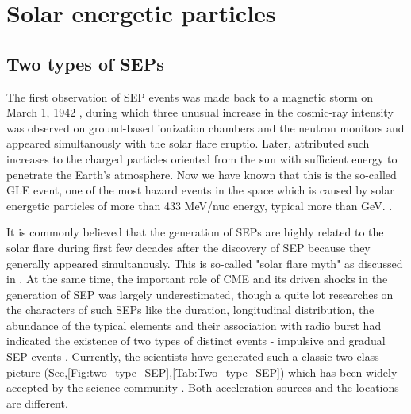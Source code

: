 \section{Solar energetic particles}

\subsection{Two types of SEPs}


The first observation of \ac{SEP} events was made back to a magnetic storm on March 1, 1942 \citet{lange1942note,forbush1942further}, during which three unusual increase in the cosmic-ray intensity was observed on ground-based ionization chambers and the neutron monitors and appeared simultanously with the solar flare eruptio. Later, \citep{Forbush1946} attributed such increases to the charged particles oriented from the sun with sufficient energy to penetrate the Earth's atmosphere. Now we have known that this is the so-called \ac{GLE} event, one of the most hazard events in the space which is caused by solar energetic particles of more than 433 MeV/nuc energy, typical more than GeV. \citet{meyer1956solar,Shea2012SSRv,gopalswamy2013first,thakur2014ground, Reames2013}.

It is commonly believed that the generation of \acp{SEP} are highly related to the solar flare during first few decades after the discovery of \ac{SEP} because they generally appeared simultanously. This is so-called "solar flare myth" as discussed in \citep{gosling1993the}. At the same time, the important role of CME and its driven shocks in the generation of \ac{SEP} was largely underestimated, though a quite lot researches on the characters of such \acp{SEP} like the duration, longitudinal distribution, the abundance of the typical elements and their association with radio burst had indicated the existence of two types of distinct events - impulsive and gradual \ac{SEP} events \citep{kahler1978prompt,kahler1984associations,cliver1982injection,cane1986two, reames1988ApJ}.
Currently, the scientists have generated such a classic two-class picture (See,\ref{Fig:two_type_SEP},\ref{Tab:Two_type_SEP}) which has been widely accepted by the science community \citet{kallenrode2003current, reames2013two,Desai_Diacalone2016LRSP, Reames2021LNP}. Both acceleration sources and the locations are different.


